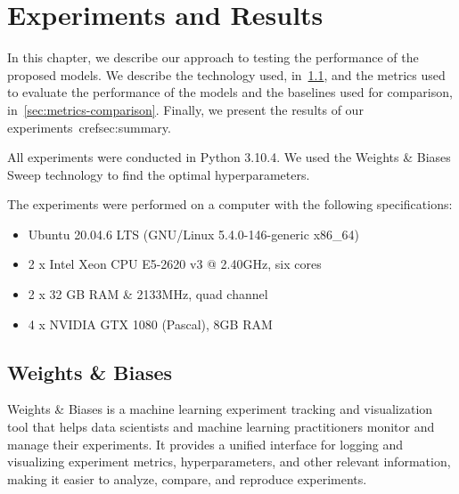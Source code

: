 \documentclass[../xlapes02]{subfiles}
\begin{document}
    \chapter{Experiments and Results}\label{sec:experiments-and-results}
    In this chapter, we describe our approach to testing the performance of the proposed models. We describe the technology used, in~\cref{sec:wandb}, and the metrics used to evaluate the performance of the models and the baselines used for comparison, in~\cref{sec:metrics-comparison}. Finally, we present the results of our experiments~cref{sec:summary}.

    All experiments were conducted in Python 3.10.4. We used the Weights \& Biases Sweep technology to find the optimal hyperparameters.

    The experiments were performed on a computer with the following specifications:
    \begin{itemize}
        \item Ubuntu 20.04.6 LTS (GNU/Linux 5.4.0-146-generic x86\_64)
        \item 2 x Intel Xeon CPU E5-2620 v3 @ 2.40GHz, six cores
        \item 2 x 32 GB RAM \& 2133MHz, quad channel
        \item 4 x NVIDIA GTX 1080 (Pascal), 8GB RAM
    \end{itemize}


    \section{Weights \& Biases}\label{sec:wandb}
    Weights \& Biases is a machine learning experiment tracking and visualization tool that helps data scientists and machine learning practitioners monitor and manage their experiments. It provides a unified interface for logging and visualizing experiment metrics, hyperparameters, and other relevant information, making it easier to analyze, compare, and reproduce experiments.
\end{document}
